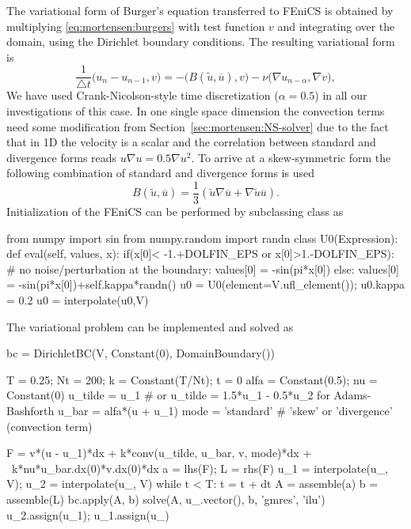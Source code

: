 The variational form of Burger's equation transferred to FEniCS is
obtained by multiplying \eqref{eq:mortensen:burgers} with test
function $v$ and integrating over the domain, using the Dirichlet
boundary conditions. The resulting variational form is
\begin{equation}
 \frac{1}{\triangle t}\bigl( u_{n} - u_{n-1} , v\bigr) = - \bigl(B(\tilde{u},\overline{u}), v \bigr) - \nu \bigl( \nabla u_{n-\alpha}, \nabla v \bigr),
\label{eq:mortensen:burgers_vf}
\end{equation}
We have used Crank-Nicolson-style time discretization ($\alpha=0.5$)
in all our investigations of this case. In one single space dimension
the convection terms need some modification from
Section~\ref{sec:mortensen:NS-solver} due to the fact that in 1D the
velocity is a scalar and the correlation between standard and
divergence forms reads $u\nabla u =0.5 \nabla u^2$. To arrive at a
skew-symmetric form the following combination of standard and
divergence forms is used
\begin{equation}
 B(\tilde{u},\overline{u}) = \frac{1}{3}\left( \tilde{u}\nabla \overline{u} + \nabla \tilde{u} \overline{u} \right).
\end{equation}
Initialization of the FEniCS
 can be performed by subclassing  class
 as
\begin{python}
from numpy import sin
from numpy.random import randn
class U0(Expression):
    def eval(self, values, x):
        if(x[0]< -1.+DOLFIN_EPS or x[0]>1.-DOLFIN_EPS):
            # no noise/perturbation at the boundary:
            values[0] = -sin(pi*x[0])
        else:
            values[0] = -sin(pi*x[0])+self.kappa*randn()
u0 = U0(element=V.ufl_element()); u0.kappa = 0.2
u0 = interpolate(u0,V)
\end{python}
The variational problem can be implemented and solved as
\begin{python}
bc = DirichletBC(V, Constant(0), DomainBoundary())

T = 0.25; Nt = 200; k = Constant(T/Nt); t = 0
alfa = Constant(0.5); nu = Constant(0)
u_tilde = u_1 # or u_tilde = 1.5*u_1 - 0.5*u_2 for Adams-Bashforth
u_bar = alfa*(u + u_1)
mode = 'standard'  # 'skew' or 'divergence' (convection term)

F = v*(u - u_1)*dx + k*conv(u_tilde, u_bar, v, mode)*dx + \
    k*nu*u_bar.dx(0)*v.dx(0)*dx
a = lhs(F); L = rhs(F)
u_1 = interpolate(u_, V); u_2 = interpolate(u_, V)
while t < T:
    t = t + dt
    A = assemble(a)
    b = assemble(L)
    bc.apply(A, b)
    solve(A, u_.vector(), b, 'gmres', 'ilu')
    u_2.assign(u_1); u_1.assign(u_)
\end{python}

